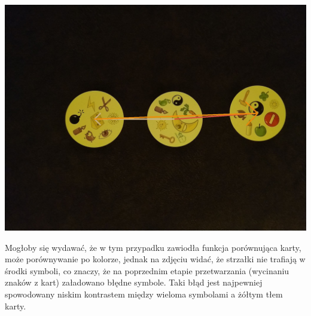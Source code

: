 \documentclass[10pt,a4paper]{article}
\begin{document}
\begin{center}
\includegraphics[scale=0.28]{hard/img_arrows17.jpg}
\end{center}
Mogłoby się wydawać, że w tym przypadku zawiodła funkcja porównująca karty, może porównywanie po kolorze, jednak na zdjęciu widać, że strzałki nie trafiają w środki symboli, co znaczy, że na poprzednim etapie przetwarzania (wycinaniu znaków z kart) załadowano błędne symbole. Taki błąd jest najpewniej spowodowany niskim kontrastem między wieloma symbolami a żółtym tłem karty.
\end{document}
